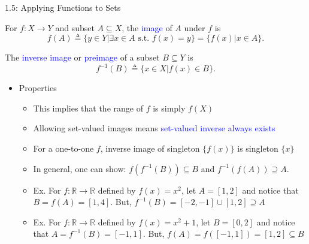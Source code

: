 \documentclass[10pt,english]{beamer}
\newcommand{\backupbegin}{
   \newcounter{finalframe}
   \setcounter{finalframe}{\value{framenumber}}
}
\newcommand{\backupend}{
   \setcounter{framenumber}{\value{finalframe}}
}
\begin{document}
\begin{frame}{1.5: Applying Functions to Sets}

\vspace{4mm}
\begin{definition}
For $f \colon X\rightarrow Y$ and subset $A\subseteq X$, the \textcolor{blue}{image} of $A$ under $f$ is \vspace{-2mm}
\[ f(A) \triangleq \{ y\in Y | \exists x\in A \textrm{ s.t. } f(x)=y\} = \{f(x) | x\in A\}. \]
\end{definition}
\vspace{0mm}
\begin{definition}
The \textcolor{blue}{inverse image} or \textcolor{blue}{preimage} of a subset $B\subseteq Y$ is \vspace{-2mm}
\[ f^{-1}(B) \triangleq \{ x\in X | f(x)\in B\}. \]
\end{definition}
\vspace{-4.5mm}

\begin{itemize}
\setlength\itemsep{3mm}
\item<2-> Properties \vspace{1mm}
\begin{itemize}
  \setlength\itemsep{1.5mm}
  \item This implies that the range of $f$ is simply $f(X)$
  \item Allowing set-valued images means \textcolor{blue}{set-valued inverse always exists}
  \item For a one-to-one $f$, inverse image of singleton $\{ f(x) \}$ is singleton $\{ x \}$
  \item In general, one can show: $f(f^{-1}(B)) \subseteq B$ and $f^{-1}(f(A)) \supseteq A$.
  \item<3-> Ex. For $f \colon \mathbb{R} \rightarrow \mathbb{R}$ defined by $f(x)=x^2$, let $A=[1,2]$ and notice that $B = f(A) = [1,4]$.  But, $f^{-1}(B) = [-2,-1] \cup [1,2] \supseteq A$
  \item<4-> Ex. For $f \colon \mathbb{R} \rightarrow \mathbb{R}$ defined by $f(x)=x^2+1$, let $B=[0,2]$ and notice that $A = f^{-1}(B) = [-1,1]$.  But, $f(A) = f([-1,1]) = [1,2] \subseteq B$
\end{itemize}
\end{itemize}

\end{frame}  
  
\backupbegin


%
%

\backupend
\end{document}
